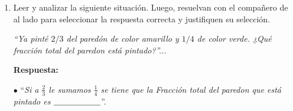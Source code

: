 \documentclass[12pt]{examdesign}
\theoremstyle{plain}
\theoremstyle{definition}
\theoremstyle{remark}
\begin{document}
\begin{endmatter}
		\begin{tcolorbox}[colback=red!10!white, colframe=tealgreen, title=\textit{Para pensar!...}:]
			\def\blank#1{$\underline{\mbox{\hphantom{#1}}}$}
			\begin{enumerate}%
				\item Leer y analizar la siguiente situación. Luego, resuelvan con el compañero de al lado para seleccionar la respuesta correcta y justifiquen su selección.
				\begin{center}%
					\textit{``Ya pinté $2/3$ del paredón de color amarillo y $1/4$ de color verde. ¿Qué fracción total del paredon está pintado?''...}
				\end{center}%
				\textbf{Respuesta:}
				\begin{center}
					$\bullet$ ``\textit{Si a $\frac{2}{3}$ le sumamos $\frac{1}{4}$ se tiene que la Fracción total del paredon que  está pintado es \blank{$\frac{8}{12} + \frac{3}{12}= \frac{11}{12}$}}''.
				\end{center}
			\end{enumerate}%
		\end{tcolorbox}
	\end{endmatter}
\end{document}
